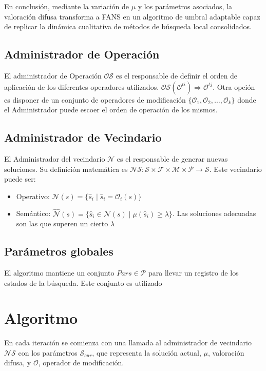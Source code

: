 \documentclass{article}
\begin{document}
En conclusión, mediante la variación de $\mu$ y los parámetros asociados, la valoración difusa transforma a FANS en un algoritmo de umbral adaptable capaz de replicar la dinámica cualitativa de métodos de búsqueda local consolidados.

\subsection{Administrador de Operación}

El administrador de Operación $\mathcal{OS}$ es el responsable de definir el orden de aplicación de los diferentes operadores utilizados.
$\mathcal{OS}(\mathcal{O}^{ti}) \Rightarrow \mathcal{O}^{tj}$. Otra opción es disponer de un conjunto de operadores de modificación $\{\mathcal{O}_1, \mathcal{O}_2,\ldots,\mathcal{O}_k\}$ donde el Administrador puede escoer el orden de operación de los mismos.

\subsection{Administrador de Vecindario}
El Administrador del vecindario $\mathcal{N}$ es el responsable de generar nuevas soluciones. Su definición matemática es 
$\mathcal{NS}:\mathcal{S}\times\mathcal{F}\times\mathcal{M}\times\mathcal{P}\rightarrow\mathcal{S}$. Este vecindario puede ser:
\begin{itemize}
    \item Operativo: $\mathcal{N}(s) = \{ \hat{s}_i \mid \hat{s}_i = \mathcal{O}_i(s) \}$
    \item Semántico: $\hat{\mathcal{N}}(s) = \{ \hat{s}_i \in \mathcal{N}(s) \mid \mu(\hat{s}_i) \geq \lambda \}$. Las soluciones adecuadas son las que superen un cierto $\lambda$
\end{itemize}

\subsection{Parámetros globales}

El algoritmo mantiene un conjunto $Pars \in \mathcal{P}$ para llevar un registro de los estados de la búsqueda. Este conjunto es utilizado

\section{Algoritmo}

En cada iteración se comienza con una llamada al administrador de vecindario $\mathcal{NS}$ con los parámetros $\mathcal{S}_{cur}$, que representa la solución actual, $\mu$, valoración difusa, y $\mathcal{O}$, operador de modificación.
\end{document}
